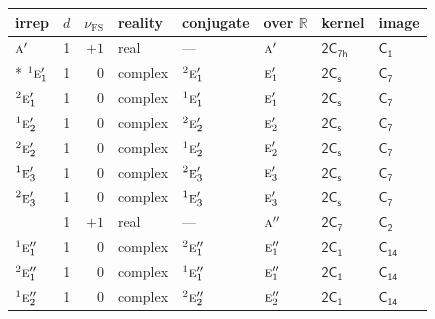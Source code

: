 \documentclass[10pt,a4paper]{article}
\numberwithin{equation}{section}
\newcommand{\grp}[1]{\mathsf{#1}}
\newcommand{\irr}[1]{\text{\normalfont\scshape #1}}
\newcommand{\conjpair}[1]{{}^{#1}}
\newcommand{\detbox}[1]{{\setlength{\fboxsep}{1pt}\fbox{#1}}}
\newcommand{\fsind}{\nu_{\mathrm{FS}}}
\begin{document}
{\small\renewcommand{\arraystretch}{1.25}\setlength{\tabcolsep}{4pt}\begin{longtable}{@{}lrrlllll@{}}\toprule
irrep & $d$ & $\fsind$ & reality & conjugate & over $\mathbb{R}$ & kernel & image\\\midrule\endhead
\bottomrule\endfoot\endlastfoot
$\irr{a}'$ & 1 & $+1$ & real & --- & $\irr{a}'$ & \href{2C7h.pdf}{$\grp{2C_{7h}}$} & \href{../../../rotation/data/pdf/C1.pdf}{$\grp{C_{1}}$}\\*
$\conjpair{1}\irr{e}_{1}'$ & 1 & $0$ & complex & $\conjpair{2}\irr{e}_{1}'$ & $\irr{e}_{1}'$ & \href{2C1v.pdf}{$\grp{2C_{s}}$} & \href{../../../rotation/data/pdf/C7.pdf}{$\grp{C_{7}}$}\\
$\conjpair{2}\irr{e}_{1}'$ & 1 & $0$ & complex & $\conjpair{1}\irr{e}_{1}'$ & $\irr{e}_{1}'$ & \href{2C1v.pdf}{$\grp{2C_{s}}$} & \href{../../../rotation/data/pdf/C7.pdf}{$\grp{C_{7}}$}\\
$\conjpair{1}\irr{e}_{2}'$ & 1 & $0$ & complex & $\conjpair{2}\irr{e}_{2}'$ & $\irr{e}_{2}'$ & \href{2C1v.pdf}{$\grp{2C_{s}}$} & \href{../../../rotation/data/pdf/C7.pdf}{$\grp{C_{7}}$}\\
$\conjpair{2}\irr{e}_{2}'$ & 1 & $0$ & complex & $\conjpair{1}\irr{e}_{2}'$ & $\irr{e}_{2}'$ & \href{2C1v.pdf}{$\grp{2C_{s}}$} & \href{../../../rotation/data/pdf/C7.pdf}{$\grp{C_{7}}$}\\
$\conjpair{1}\irr{e}_{3}'$ & 1 & $0$ & complex & $\conjpair{2}\irr{e}_{3}'$ & $\irr{e}_{3}'$ & \href{2C1v.pdf}{$\grp{2C_{s}}$} & \href{../../../rotation/data/pdf/C7.pdf}{$\grp{C_{7}}$}\\
$\conjpair{2}\irr{e}_{3}'$ & 1 & $0$ & complex & $\conjpair{1}\irr{e}_{3}'$ & $\irr{e}_{3}'$ & \href{2C1v.pdf}{$\grp{2C_{s}}$} & \href{../../../rotation/data/pdf/C7.pdf}{$\grp{C_{7}}$}\\
\detbox{$\irr{a}''$} & 1 & $+1$ & real & --- & $\irr{a}''$ & \href{2C7.pdf}{$\grp{2C_{7}}$} & \href{../../../rotation/data/pdf/C2.pdf}{$\grp{C_{2}}$}\\
$\conjpair{1}\irr{e}_{1}''$ & 1 & $0$ & complex & $\conjpair{2}\irr{e}_{1}''$ & $\irr{e}_{1}''$ & \href{2C1.pdf}{$\grp{2C_{1}}$} & $\grp{C_{14}}$\\
$\conjpair{2}\irr{e}_{1}''$ & 1 & $0$ & complex & $\conjpair{1}\irr{e}_{1}''$ & $\irr{e}_{1}''$ & \href{2C1.pdf}{$\grp{2C_{1}}$} & $\grp{C_{14}}$\\
$\conjpair{1}\irr{e}_{2}''$ & 1 & $0$ & complex & $\conjpair{2}\irr{e}_{2}''$ & $\irr{e}_{2}''$ & \href{2C1.pdf}{$\grp{2C_{1}}$} & $\grp{C_{14}}$\\

\end{longtable}}
\end{document}
